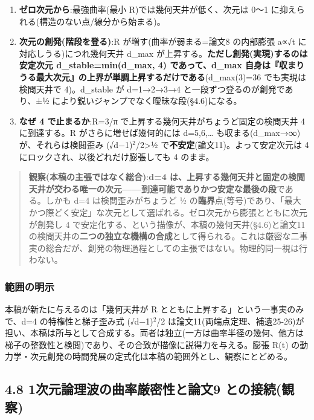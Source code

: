 \documentclass[
]{ltjsarticle}
\begin{document}
\begin{enumerate}
\def\labelenumi{(\roman{enumi})}
\item
  \textbf{ゼロ次元から}:最強曲率(最小 R)では幾何天井が低く、次元は 0〜1
  に抑えられる(構造のない点/線分から始まる)。
\item
  \textbf{次元の創発(階段を登る)}:R が増す(曲率が弱まる=論文8 の内部膨張
  a∝√t に対応しうる)につれ幾何天井 d\_max
  が上昇する。\textbf{ただし創発(実現)するのは安定次元
  d\_stable=min(d\_max, 4) であって、d\_max
  自身は『収まりうる最大次元』の上界が単調上昇するだけである}(d\_max(3)=36
  でも実現は検閲天井で 4)。d\_stable が d=1→2→3→4
  と一段ずつ登るのが創発であり、±½
  により鋭いジャンプでなく曖昧な段(§4.6)になる。
\item
  \textbf{なぜ 4 で止まるか}:R=3/π
  で上昇する幾何天井がちょうど固定の検閲天井 4 に到達する。R
  がさらに増せば幾何的には d=5,6,\ldots{}
  も収まる(d\_max→∞)が、それらは検閲歪み (√d−1)\(^{2}\)/2\textgreater½
  で\textbf{不安定}(論文11)。よって安定次元は 4
  にロックされ、以後どれだけ膨張しても 4 のまま。
\end{enumerate}

\begin{quote}
\textbf{観察(本稿の主張ではなく総合)}:\textbf{d=4
は、上昇する幾何天井と固定の検閲天井が交わる唯一の次元------到達可能でありかつ安定な最後の段}である。しかも
d=4 は検閲歪みがちょうど ½
の\textbf{臨界}点(等号)であり、「最大かつ際どく安定」な次元として選ばれる。ゼロ次元から膨張とともに次元が創発し
4 で安定化する、という描像が、本稿の幾何天井(§4.6)と論文11
の検閲天井の\textbf{二つの独立な機構の合成}として得られる。これは厳密な二事実の総合だが、創発の物理過程としての主張ではない。物理的同一視は行わない。
\end{quote}

\subsubsection{範囲の明示}\label{ux7bc4ux56f2ux306eux660eux793a}

本稿が新たに与えるのは「幾何天井が R
とともに上昇する」という一事実のみで、d=4 の特権性と梯子歪み式
(√d−1)\(^{2}\)/2
は論文11(両端点定理、補遺25-26)が担い、本稿は所与として合成する。両者は独立(一方は曲率半径の幾何、他方は梯子の整数性と検閲)であり、その合致が描像に説得力を与える。膨張
R(t)
の動力学・次元創発の時間発展の定式化は本稿の範囲外とし、観察にとどめる。

\subsection{4.8 1次元論理波の曲率厳密性と論文9
との接続(観察)}\label{ux6b21ux5143ux8ad6ux7406ux6ce2ux306eux66f2ux7387ux53b3ux5bc6ux6027ux3068ux8ad6ux65879-ux3068ux306eux63a5ux7d9aux89b3ux5bdf}
\end{document}
